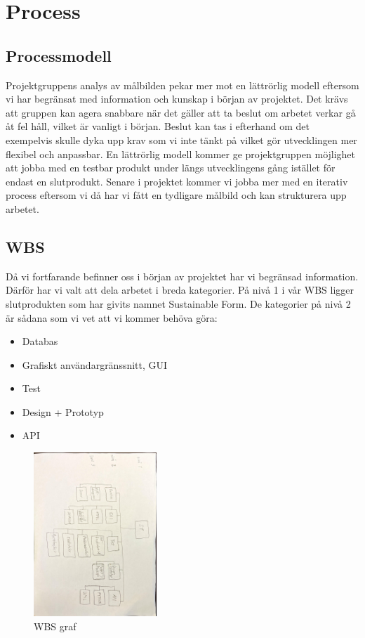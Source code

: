 \documentclass[12pt]{article}
\begin{document}
\newpage
\section{Process}
\subsection{Processmodell}

Projektgruppens analys av målbilden pekar mer mot en lättrörlig modell eftersom vi har begränsat med information och kunskap i början av projektet.
Det krävs att gruppen kan agera snabbare när det gäller att ta beslut om arbetet verkar gå åt fel håll, vilket är vanligt i början. Beslut kan tas i
efterhand om det exempelvis skulle dyka upp krav som vi inte tänkt på vilket gör
utvecklingen mer flexibel och anpassbar. En lättrörlig modell kommer ge projektgruppen
möjlighet att jobba med en testbar produkt under längs utvecklingens gång istället för endast
en slutprodukt. Senare i projektet kommer vi jobba mer med en iterativ process eftersom vi
då har vi fått en tydligare målbild och kan strukturera upp arbetet.
\subsection{WBS}
Då vi fortfarande befinner oss i början av projektet har vi begränsad information. Därför har vi valt att dela arbetet i breda kategorier. På nivå 1 i vår WBS ligger slutprodukten som har givits namnet Sustainable Form. De kategorier på nivå 2 är sådana som vi vet att vi kommer behöva göra: 
\begin{itemize}
\item Databas
\item Grafiskt användargränssnitt, GUI
\item Test
\item Design + Prototyp
\item API
\end{itemize}
\begin{figure}[htp]
    \centering
    \includegraphics[width = 175px,angle=90]{WBS.jpg}
    \caption{WBS graf}
    \label{fig:WBS graf}
\end{figure}
\end{document}
